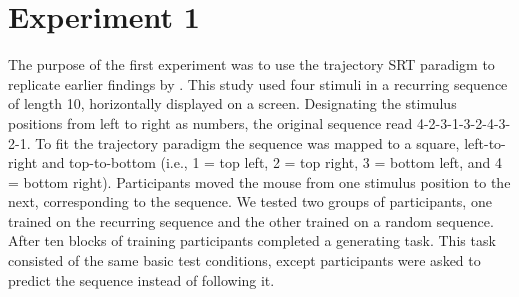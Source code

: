 \documentclass[man,floatsintext]{apa6}
\begin{document}




\section{Experiment 1}

The purpose of the first experiment was to use the trajectory SRT paradigm to replicate earlier findings by . This study used four stimuli in a recurring sequence of length 10, horizontally displayed on a screen. Designating the stimulus positions from left to right as numbers, the original sequence read 4-2-3-1-3-2-4-3-2-1. To fit the trajectory paradigm the sequence was mapped to a square, left-to-right and top-to-bottom (i.e., 1 = top left, 2 = top right, 3 = bottom left, and 4 = bottom right). Participants moved the mouse from one stimulus position to the next, corresponding to the sequence. We tested two groups of participants, one trained on the recurring sequence and the other trained on a random sequence. After ten blocks of training participants completed a generating task. This task consisted of the same basic test conditions, except participants were asked to predict the sequence instead of following it. 
\end{document}
